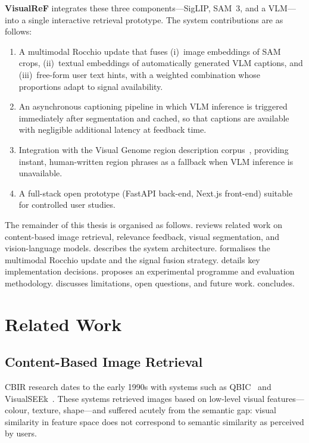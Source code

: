 \documentclass[12pt,a4paper]{article}
\begin{document}
\textbf{VisualReF} integrates these three components—SigLIP, SAM~3, and a
VLM—into a single interactive retrieval prototype. The system contributions
are as follows:

\begin{enumerate}[leftmargin=1.5em]
  \item A multimodal Rocchio update that fuses (i)~image embeddings of SAM
        crops, (ii)~textual embeddings of automatically generated VLM captions,
        and (iii)~free-form user text hints, with a weighted combination whose
        proportions adapt to signal availability.
  \item An asynchronous captioning pipeline in which VLM inference is triggered
        immediately after segmentation and cached, so that captions are
        available with negligible additional latency at feedback time.
  \item Integration with the Visual Genome region description
        corpus~\citep{Krishna2017}, providing instant, human-written region
        phrases as a fallback when VLM inference is unavailable.
  \item A full-stack open prototype (FastAPI back-end, Next.js front-end)
        suitable for controlled user studies.
\end{enumerate}

The remainder of this thesis is organised as follows.
 reviews related work on content-based image retrieval,
relevance feedback, visual segmentation, and vision-language models.
 describes the system architecture.
 formalises the multimodal Rocchio update and the signal
fusion strategy.
 details key implementation decisions.
 proposes an experimental programme and evaluation
methodology.
 discusses limitations, open questions, and future work.
 concludes.

\section{Related Work}
\label{sec:related}

\subsection{Content-Based Image Retrieval}

CBIR research dates to the early 1990s with systems such as QBIC~\citep{Flickner1995}
and VisualSEEk~\citep{Smith1996}. These systems retrieved images based on
low-level visual features—colour, texture, shape—and suffered acutely from the
semantic gap: visual similarity in feature space does not correspond to
semantic similarity as perceived by users.
\end{document}
